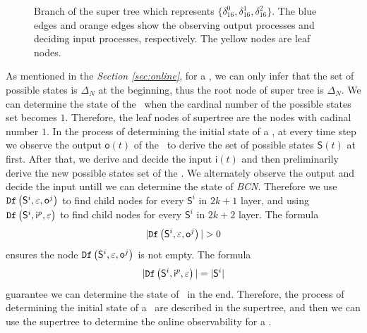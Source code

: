   \begin{figure}[thpb]
      \centering
      
      \caption{Branch of the super tree which represents $\{\delta_{16}^0,\delta_{16}^1,\delta_{16}^2\}$. The blue edges and orange edges show the observing output processes and deciding input processes, respectively. The yellow nodes are leaf nodes.}
      \label{fig:3}
   \end{figure}

As mentioned in the {\em Section \ref{sec:online}}, for a \BCN, we can only infer that the set of possible states is $\Delta_N$ at the beginning, thus the root node of super tree is $\Delta_N$. We can determine the state of the \BCN\ when the cardinal number of the possible states set becomes $1$. Therefore, the leaf nodes of supertree are the nodes with cadinal number $1$. In the process of determining the initial state of a \BCN, at every time step we observe the output $\mathsf{o}(t)$ of the \BCN\ to derive the set of possible states $\mathsf{S}(t)$ at first. After that, we derive and decide the input $\mathsf{i}(t)$ and then preliminarily derive the new possible states set of the \BCN. We alternately observe the output and decide the input untill we can determine the state of {\em BCN}. Therefore we use ${\tt Df}\left(\mathsf{S}^i,\varepsilon, \mathsf{o}^j\right)$ to find child nodes for every $\mathsf{S}^i$ in $2k+1$ layer, and using ${\tt Df}\left(\mathsf{S}^i,\mathsf{i}^p,\varepsilon\right)$ to find child nodes for every $\mathsf{S}^i$ in $2k+2$ layer. The formula 
\[|\Ded\left(\mathsf{S}^i,\varepsilon, \mathsf{o}^j\right)|>0\]
 ensures the node ${\tt Df}\left(\mathsf{S}^i,\varepsilon, \mathsf{o}^j\right)$ is not empty. The formula 
 \[|{\tt Df}\left(\mathsf{S}^i,\mathsf{i}^p,\varepsilon\right)|=|\mathsf{S}^i|\] 
 guarantee we can determine the state of \BCN\ in the end. Therefore, the process of determining the initial state of a \BCN\ are described in the supertree, and then we can use the supertree to determine the online observability for a \BCN.

